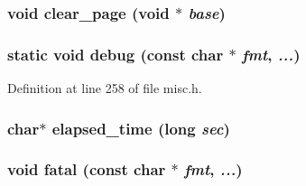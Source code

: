 \subsubsection[{clear\_\-page}]{\setlength{\rightskip}{0pt plus 5cm}void clear\_\-page (void $\ast$ {\em base})}\label{misc_8h_d091becb391041832a4ea32756df29b1}


\subsubsection[{debug}]{\setlength{\rightskip}{0pt plus 5cm}static void debug (const char $\ast$ {\em fmt}, \/   {\em ...})\hspace{0.3cm}{\tt  [static]}}\label{misc_8h_61a4c48c5d216baea50bfcef37c3d9fa}




Definition at line 258 of file misc.h.
\subsubsection[{elapsed\_\-time}]{\setlength{\rightskip}{0pt plus 5cm}char$\ast$ elapsed\_\-time (long {\em sec})}\label{misc_8h_4e699a9d021f92b45004b0534715a5d6}


\subsubsection[{fatal}]{\setlength{\rightskip}{0pt plus 5cm}void fatal (const char $\ast$ {\em fmt}, \/   {\em ...})}\label{misc_8h_677da14e8c4326bde43622f233f1ead3}




